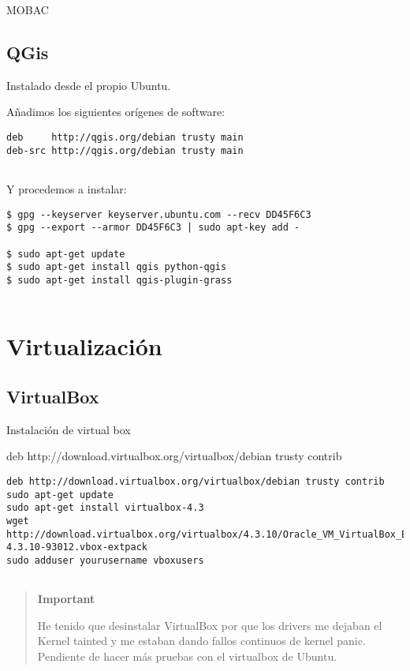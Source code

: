 MOBAC

\subsection{QGis}\label{qgis}

Instalado desde el propio Ubuntu.

Añadimos los siguientes orígenes de software:

\begin{verbatim}
deb     http://qgis.org/debian trusty main
deb-src http://qgis.org/debian trusty main
      
\end{verbatim}

Y procedemos a instalar:

\begin{verbatim}
$ gpg --keyserver keyserver.ubuntu.com --recv DD45F6C3
$ gpg --export --armor DD45F6C3 | sudo apt-key add -

$ sudo apt-get update
$ sudo apt-get install qgis python-qgis
$ sudo apt-get install qgis-plugin-grass
      
\end{verbatim}

\section{Virtualización}\label{virtualizaciuxf3n}

\subsection{VirtualBox}\label{virtualbox}

Instalación de virtual box

deb http://download.virtualbox.org/virtualbox/debian trusty contrib

\begin{verbatim}
deb http://download.virtualbox.org/virtualbox/debian trusty contrib
sudo apt-get update
sudo apt-get install virtualbox-4.3
wget http://download.virtualbox.org/virtualbox/4.3.10/Oracle_VM_VirtualBox_Extension_Pack-4.3.10-93012.vbox-extpack
sudo adduser yourusername vboxusers
      
\end{verbatim}

\begin{quote}
\textbf{Important}

He tenido que desinstalar VirtualBox por que los drivers me dejaban el
Kernel tainted y me estaban dando fallos continuos de kernel panic.
Pendiente de hacer más pruebas con el virtualbox de Ubuntu.
\end{quote}

